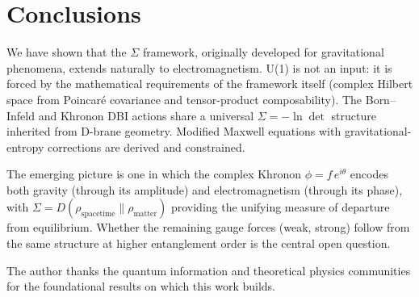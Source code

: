\documentclass[prl,twocolumn,superscriptaddress,longbibliography]{revtex4-2}
\begin{document}
\section{Conclusions}
\label{sec:conclusions}

We have shown that the $\Sigma$ framework, originally developed
for gravitational phenomena, extends naturally to
electromagnetism.
U(1) is not an input: it is forced by the mathematical
requirements of the framework itself (complex Hilbert space from
Poincar\'{e} covariance and tensor-product composability).
The Born--Infeld and Khronon DBI actions share a universal
$\Sigma = -\ln\det$ structure inherited from D-brane geometry.
Modified Maxwell equations with gravitational-entropy
corrections are derived and constrained.

The emerging picture is one in which the complex Khronon
$\phi = f\,e^{i\theta}$ encodes both gravity (through its
amplitude) and electromagnetism (through its phase), with
$\Sigma = D(\rho_{\mathrm{spacetime}} \| \rho_{\mathrm{matter}})$
providing the unifying measure of departure from equilibrium.
Whether the remaining gauge forces (weak, strong) follow from the
same structure at higher entanglement order is the central open
question.

\begin{acknowledgments}
The author thanks the quantum information and theoretical
physics communities for the foundational results on which this
work builds.
\end{acknowledgments}
\end{document}
